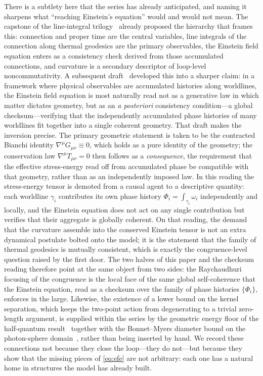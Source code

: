 \documentclass[%
 reprint, amsmath,amssymb, aps, prb, ]{revtex4-2}
\numberwithin{equation}{section}
\begin{document}
There is a subtlety here that the series has already anticipated, and naming it sharpens what ``reaching Einstein's equation'' would and would not mean. The capstone of the line-integral trilogy~\cite{hanamura31} already proposed the hierarchy that frames this: connection and proper time are the central variables, line integrals of the connection along thermal geodesics are the primary observables, the Einstein field equation enters as a consistency check derived from those accumulated connections, and curvature is a secondary descriptor of loop-level noncommutativity. A subsequent draft~\cite{hanamura30} developed this into a sharper claim: in a framework where physical observables are accumulated histories along worldlines, the Einstein field equation is most naturally read not as a generative law in which matter dictates geometry, but as an \emph{a posteriori} consistency condition---a global checksum---verifying that the independently accumulated phase histories of many worldlines fit together into a single coherent geometry. That draft makes the inversion precise. The primary geometric statement is taken to be the contracted Bianchi identity $\nabla^\mu G_{\mu\nu}\equiv 0$, which holds as a pure identity of the geometry; the conservation law $\nabla^\mu T_{\mu\nu}=0$ then follows as a \emph{consequence}, the requirement that the effective stress-energy read off from accumulated phase be compatible with that geometry, rather than as an independently imposed law. In this reading the stress-energy tensor is demoted from a causal agent to a descriptive quantity: each worldline $\gamma_i$ contributes its own phase history $\Phi_i=\int_{\gamma_i}\omega_i$ independently and locally, and the Einstein equation does not act on any single contribution but verifies that their aggregate is globally coherent. On that reading, the demand that the curvature assemble into the conserved Einstein tensor is not an extra dynamical postulate bolted onto the model; it is the statement that the family of thermal geodesics is mutually consistent, which is exactly the congruence-level question raised by the first door. The two halves of this paper and the checksum reading therefore point at the same object from two sides: the Raychaudhuri focusing of the congruence is the local face of the same global self-coherence that the Einstein equation, read as a checksum over the family of phase histories $\{\Phi_i\}$, enforces in the large. Likewise, the existence of a lower bound on the kernel separation, which keeps the two-point action from degenerating to a trivial zero-length argument, is supplied within the series by the geometric energy floor of the half-quantum result~\cite{hanamura46} together with the Bonnet--Myers diameter bound on the photon-sphere domain~\cite{hanamura51}, rather than being inserted by hand. We record these connections not because they close the loop---they do not---but because they show that the missing pieces of \eqref{eq:efe} are not arbitrary: each one has a natural home in structures the model has already built.
\end{document}
